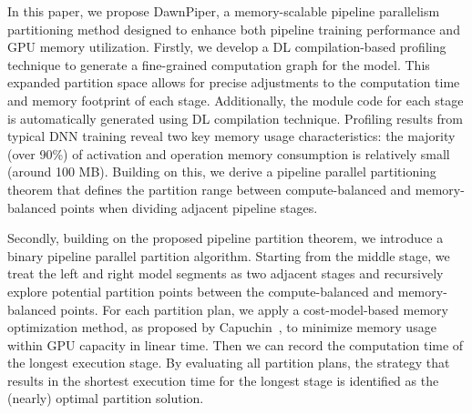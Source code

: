In this paper, we propose DawnPiper, a memory-scalable pipeline parallelism partitioning method
designed to enhance both pipeline training performance and GPU memory utilization.
Firstly, we develop a DL compilation-based profiling technique
to generate a fine-grained computation graph for the model.
This expanded partition space allows for precise adjustments to the computation time and memory footprint of each stage.
Additionally, the module code for each stage is automatically generated using DL compilation technique.
Profiling results from typical DNN training reveal two key memory usage characteristics:
the majority (over 90\%) of activation and operation memory consumption is relatively small (around 100 MB).
Building on this, we derive a pipeline parallel partitioning theorem that defines
the partition range between compute-balanced and memory-balanced points when dividing adjacent pipeline stages.

Secondly, building on the proposed pipeline partition theorem,
we introduce a binary pipeline parallel partition algorithm.
Starting from the middle stage,
we treat the left and right model segments as two adjacent stages
and recursively explore potential partition points between the compute-balanced and memory-balanced points.
For each partition plan, we apply a cost-model-based memory optimization method,
as proposed by Capuchin~\cite{pengCapuchinTensorbasedGPU2020}, to minimize memory usage within GPU capacity in linear time.
Then we can record the computation time of the longest execution stage.
By evaluating all partition plans, the strategy that results in the shortest execution time for the longest stage
is identified as the (nearly) optimal partition solution.

